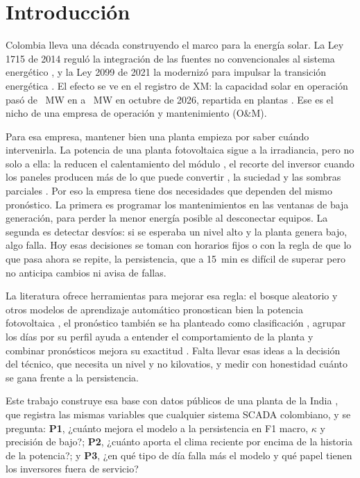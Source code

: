 \documentclass[conference]{IEEEtran}
\begin{document}
\section{Introducci\'on}
Colombia lleva una d\'ecada construyendo el marco para la energ\'ia solar. La Ley 1715 de 2014 regul\'o la integraci\'on de las fuentes no convencionales al sistema energ\'etico \cite{ley1715}, y la Ley 2099 de 2021 la moderniz\'o para impulsar la transici\'on energ\'etica \cite{ley2099}. El efecto se ve en el registro de XM: la capacidad solar en operaci\'on pas\'o de \simemMWIni{}~MW en \simemAnioIni{} a \simemMWFin{}~MW en octubre de 2026, repartida en \simemPlantasFin{} plantas \cite{xm}. Ese es el nicho de una empresa de operaci\'on y mantenimiento (O\&M).

Para esa empresa, mantener bien una planta empieza por saber cu\'ando intervenirla. La potencia de una planta fotovoltaica sigue a la irradiancia, pero no solo a ella: la reducen el calentamiento del m\'odulo \cite{skoplaki}, el recorte del inversor cuando los paneles producen m\'as de lo que puede convertir \cite{good}, la suciedad \cite{diazgranados,costa} y las sombras parciales \cite{yaouba,maki}. Por eso la empresa tiene dos necesidades que dependen del mismo pron\'ostico. La primera es programar los mantenimientos en las ventanas de baja generaci\'on, para perder la menor energ\'ia posible al desconectar equipos. La segunda es detectar desv\'ios: si se esperaba un nivel alto y la planta genera bajo, algo falla. Hoy esas decisiones se toman con horarios fijos o con la regla de que lo que pasa ahora se repite, la persistencia, que a 15~min es dif\'icil de superar pero no anticipa cambios ni avisa de fallas.

La literatura ofrece herramientas para mejorar esa regla: el bosque aleatorio y otros modelos de aprendizaje autom\'atico pronostican bien la potencia fotovoltaica \cite{cantillo}, el pron\'ostico tambi\'en se ha planteado como clasificaci\'on \cite{theocharides}, agrupar los d\'ias por su perfil ayuda a entender el comportamiento de la planta \cite{santiago} y combinar pron\'osticos mejora su exactitud \cite{clemen}. Falta llevar esas ideas a la decisi\'on del t\'ecnico, que necesita un nivel y no kilovatios, y medir con honestidad cu\'anto se gana frente a la persistencia.

Este trabajo construye esa base con datos p\'ublicos de una planta de la India \cite{kaggle}, que registra las mismas variables que cualquier sistema SCADA colombiano, y se pregunta: \textbf{P1}, ¿cu\'anto mejora el modelo a la persistencia en F1 macro, $\kappa$ y precisi\'on de bajo?; \textbf{P2}, ¿cu\'anto aporta el clima reciente por encima de la historia de la potencia?; y \textbf{P3}, ¿en qu\'e tipo de d\'ia falla m\'as el modelo y qu\'e papel tienen los inversores fuera de servicio?
\end{document}
